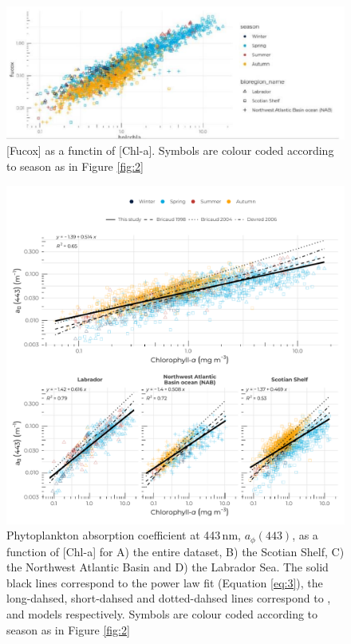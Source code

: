 \documentclass[utf8]{frontiersSCNS} %
\begin{document}
\begin{figure}[h!]
\begin{center}
\includegraphics[width=16cm]{fig03.pdf}
\end{center}
\caption{[Fucox] as a functin of [Chl-a]. Symbols are colour coded according to season as in Figure \ref{fig:2}}\label{fig:3}
\end{figure}

\begin{figure}[h!]
\begin{center}
\includegraphics[width=16cm]{fig04.pdf}
\end{center}
\caption{Phytoplankton absorption coefficient at 443\,nm, $a_\phi(443)$, as a function of [Chl-a] for A) the entire dataset, B) the Scotian Shelf, C) the Northwest Atlantic Basin and D) the Labrador Sea. The solid black lines correspond to the power law fit (Equation \ref{eq:3}), the long-dahsed, short-dahsed and dotted-dahsed lines correspond to \cite{bricaud1998}, \cite{bricaud2004} and \cite{devred2006} models respectively. Symbols are colour coded according to season as in Figure \ref{fig:2}}\label{fig:4}
\end{figure}
\end{document}
